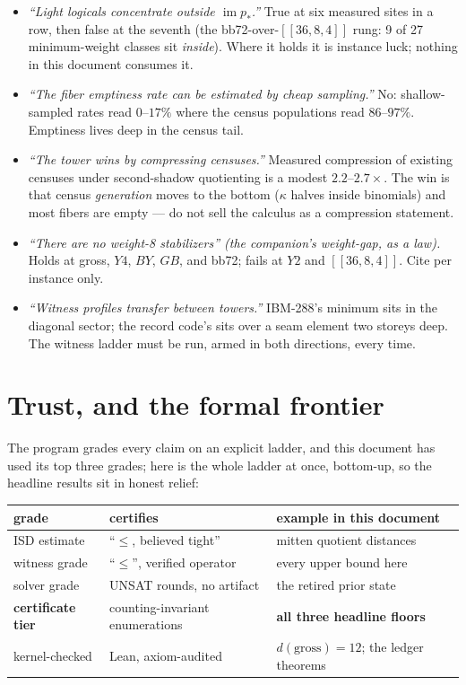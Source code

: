 \documentclass[11pt]{article}
\theoremstyle{plain}
\theoremstyle{definition}
\theoremstyle{remark}
\begin{document}
\begin{itemize}[leftmargin=2em]
\item \emph{``Light logicals concentrate outside $\operatorname{im}
  p_*$.''} True at six measured sites in a row, then false at the
  seventh (the bb72-over-$[[36,8,4]]$ rung: 9 of 27 minimum-weight
  classes sit \emph{inside}). Where it holds it is instance luck;
  nothing in this document consumes it.
\item \emph{``The fiber emptiness rate can be estimated by cheap
  sampling.''} No: shallow-sampled rates read $0$--$17\%$ where the
  census populations read $86$--$97\%$. Emptiness lives deep in the
  census tail.
\item \emph{``The tower wins by compressing censuses.''} Measured
  compression of existing censuses under second-shadow quotienting is a
  modest $2.2$--$2.7\times$. The win is that census \emph{generation}
  moves to the bottom ($\kappa$ halves inside binomials) and most fibers
  are empty --- do not sell the calculus as a compression statement.
\item \emph{``There are no weight-8 stabilizers'' (the companion's
  weight-gap, as a law).} Holds at gross, $Y4$, $BY$, $GB$, and bb72;
  fails at $Y2$ and $[[36,8,4]]$. Cite per instance only.
\item \emph{``Witness profiles transfer between towers.''} IBM-288's
  minimum sits in the diagonal sector; the record code's sits over a
  seam element two storeys deep. The witness ladder must be run, armed
  in both directions, every time.
\end{itemize}

\section{Trust, and the formal frontier}
\label{sec:trust}

The program grades every claim on an explicit ladder, and this document
has used its top three grades; here is the whole ladder at once,
bottom-up, so the headline results sit in honest relief:

\begin{center}
\small
\begin{tabular}{lll}
\toprule
grade & certifies & example in this document\\
\midrule
ISD estimate & ``$\leq$, believed tight'' & mitten quotient distances\\
witness grade & ``$\leq$'', verified operator & every upper bound here\\
solver grade & UNSAT rounds, no artifact & the retired prior state\\
\textbf{certificate tier} & counting-invariant enumerations &
\textbf{all three headline floors}\\
kernel-checked & Lean, axiom-audited & $d(\mathrm{gross}) = 12$;
the ledger theorems\\
\bottomrule
\end{tabular}
\end{center}
\end{document}
